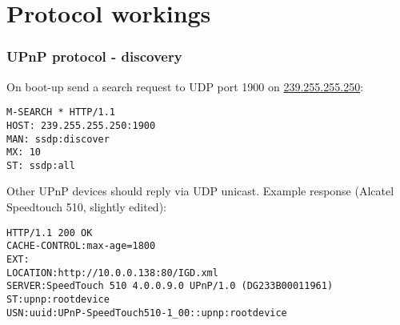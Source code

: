 \documentclass[10pt]{beamer}
\begin{document}
\section[Protocol workings]{Protocol workings}




\begin{frame}[fragile]

\frametitle{UPnP protocol - discovery}

On boot-up send a search request to UDP port 1900 on \url{239.255.255.250}:

\begin{verbatim}
M-SEARCH * HTTP/1.1
HOST: 239.255.255.250:1900
MAN: ssdp:discover
MX: 10
ST: ssdp:all
\end{verbatim}

Other UPnP devices should reply via UDP unicast. Example response (Alcatel
Speedtouch 510, slightly edited):

\begin{verbatim}
HTTP/1.1 200 OK
CACHE-CONTROL:max-age=1800
EXT:
LOCATION:http://10.0.0.138:80/IGD.xml
SERVER:SpeedTouch 510 4.0.0.9.0 UPnP/1.0 (DG233B00011961)
ST:upnp:rootdevice
USN:uuid:UPnP-SpeedTouch510-1_00::upnp:rootdevice
\end{verbatim}
\end{frame}
\end{document}
